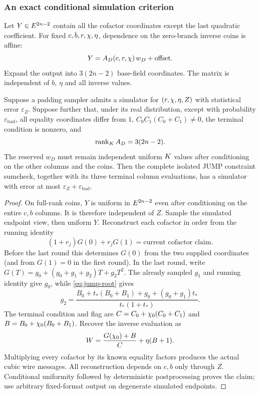 \subsubsection{An exact conditional simulation criterion}

Let $Y\in E^{2n-2}$ contain all the cofactor coordinates except the last quadratic coefficient. For fixed $c,b,r,\chi,\eta$, dependence on the zero-branch inverse coins is affine:
\[
 Y=A_D(c,r,\chi)\,w_D+\text{offset}.
\]
Expand the output into $3(2n-2)$ base-field coordinates. The matrix is independent of $b$, $\eta$ and all inverse values.

\begin{proposition}\label{prop:jump-conditional}
Suppose a padding sampler admits a simulator for $(r,\chi,\eta,Z)$ with statistical error $\varepsilon_Z$. Suppose further that, under its real distribution, except with probability $\varepsilon_{\mathrm{bad}}$, all equality coordinates differ from $1$, $C_0C_1(C_0+C_1)\ne0$, the terminal condition is nonzero, and
\[
 \operatorname{rank}_{K} A_D=3(2n-2).
\]
The reserved $w_D$ must remain independent uniform $K$ values after conditioning on the other columns and the coins. Then the complete isolated JUMP constraint sumcheck, together with its three terminal column evaluations, has a simulator with error at most $\varepsilon_Z+\varepsilon_{\mathrm{bad}}$.
\end{proposition}
\begin{proof}
On full-rank coins, $Y$ is uniform in $E^{2n-2}$ even after conditioning on the entire $c,b$ columns. It is therefore independent of $Z$. Sample the simulated endpoint view, then uniform $Y$. Reconstruct each cofactor in order from the running identity
\[
 (1+r_j)G(0)+r_jG(1)=\text{current cofactor claim}.
\]
Before the last round this determines $G(0)$ from the two supplied coordinates (and from $G(1)=0$ in the first round). In the last round, write $G(T)=g_0+(g_0+g_1+g_2)T+g_2T^2$. The already sampled $g_1$ and running identity give $g_0$, while \eqref{eq:jump-root} gives
\[
 g_2=\frac{B_0+t_*(B_0+B_1)+g_0+(g_0+g_1)t_*}{t_*(1+t_*)}.
\]
The terminal condition and flag are $C=C_0+\chi_0(C_0+C_1)$ and $B=B_0+\chi_0(B_0+B_1)$. Recover the inverse evaluation as
\[
 W=\frac{G(\chi_0)+B}{C}+\eta(B+1).
\]
Multiplying every cofactor by its known equality factors produces the actual cubic wire messages. All reconstruction depends on $c,b$ only through $Z$. Conditional uniformity followed by deterministic postprocessing proves the claim; use arbitrary fixed-format output on degenerate simulated endpoints.
\end{proof}

